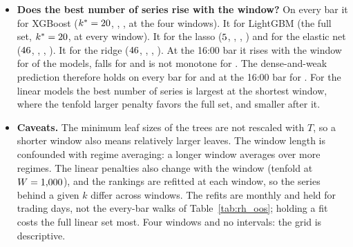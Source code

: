 \begin{itemize}
  window (ridge \rhcxGainRidgeBarOneFull, \rhcxGainRidgeBarTwoFull, \rhcxGainRidgeBarMainFull,
  \rhcxGainRidgeBarLongFull).
\item \textbf{Does the best number of series rise with the window?} On every bar it \rhcxKstarReadXgbBar{} for
  XGBoost ($k^\ast = 20$, \rhcxKstarXgbBarTwo, \rhcxKstarXgbBarMain, \rhcxKstarXgbBarLong{} at the
  four windows). It \rhcxKstarReadLgbmBar{} for LightGBM (the full set, $k^\ast = 20$, at every
  window). It \rhcxKstarReadLassoBar{} for the lasso ($5$, \rhcxKstarLassoBarTwo,
  \rhcxKstarLassoBarMain, \rhcxKstarLassoBarLong) and \rhcxKstarReadEnetBar{} for the elastic net
  ($46$, \rhcxKstarEnetBarTwo, \rhcxKstarEnetBarMain, \rhcxKstarEnetBarLong). It
  \rhcxKstarReadRidgeBar{} for the ridge ($46$, \rhcxKstarRidgeBarTwo, \rhcxKstarRidgeBarMain,
  \rhcxKstarRidgeBarLong). At the 16:00 bar it rises with the window for \rhcxWhoKstarRisesClose{} of the models,
  falls for \rhcxWhoKstarFallsClose{} and is not monotone for \rhcxWhoKstarMixedClose. The dense-and-weak prediction
  therefore holds on every bar for \rhcxWhoKstarRisesBar{} and at the 16:00 bar for \rhcxWhoKstarRisesClose. For the
  linear models the best number of series is largest at the shortest window, where the tenfold larger penalty favors
  the full set, and smaller after it.
\item \textbf{Caveats.} The minimum leaf sizes of the trees are not rescaled with $T$, so a shorter window also means
  relatively larger leaves. The window length is confounded with regime averaging: a longer window averages over more
  regimes. The linear penalties also change with the window (tenfold at $W = 1{,}000$), and the rankings are
  refitted at each window, so the series behind a given $k$ differ across windows. The refits are monthly and held for
  \rhfipOriginEvery{} trading days, not the every-bar walks of Table~\ref{tab:rh_oos}; holding a fit costs the full
  linear set most.
  Four windows and no intervals: the grid is descriptive.
\end{itemize}

